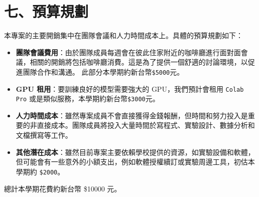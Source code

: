 \documentclass[12pt,a4paper]{article}
\begin{document}
\section*{七、預算規劃}
本專案的主要開銷集中在團隊會議和人力時間成本上。具體的預算規劃如下：
\begin{itemize}
    \item \textbf{團隊會議費用}：由於團隊成員每週會在彼此住家附近的咖啡廳進行面對面會議，相關的開銷將包括咖啡廳消費。這是為了提供一個舒適的討論環境，以促進團隊合作和溝通。
    此部分本學期約新台幣\texttt{\$5000}元。 
    \item \textbf{GPU 租用}：要訓練良好的模型需要強大的 GPU，我們預計會租用 \texttt{Colab Pro} 或是類似服務，本學期約新台幣\texttt{\$3000}元。
    \item \textbf{人力時間成本}：雖然專案成員不會直接獲得金錢報酬，但時間和努力投入是重要的非直接成本。團隊成員將投入大量時間於寫程式、實驗設計、數據分析和文檔撰寫等工作。
    \item \textbf{其他潛在成本}：雖然目前專案主要依賴學校提供的資源，如實驗設備和軟體，但可能會有一些意外的小額支出，例如軟體授權續訂或實驗周邊工具，初估本學期約 \texttt{\$2000}。
\end{itemize}
總計本學期花費約新台幣 \$10000 元。
\end{document}
